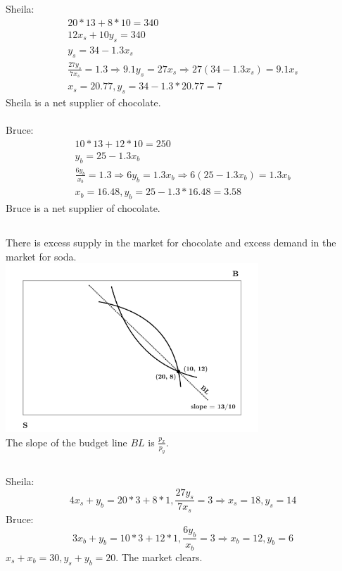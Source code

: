 \documentclass{article}
\begin{document}
	\subsection[d]{}
		Sheila:
		\setcounter{equation}{0}
		\begin{align}
			20*13+8*10 = 340\\
			12x_s+10y_s = 340\\
			y_s = 34-1.3x_s\\
			\frac{27y_s}{7x_s} = 1.3 \Rightarrow 9.1y_s = 27x_s \Rightarrow 27(34-1.3x_s) = 9.1x_s\\
			x_s = 20.77, y_s=34-1.3*20.77 = 7
		\end{align}
		Sheila is a net supplier of chocolate. 
		\\\\
		Bruce: 	
		\setcounter{equation}{0}
		\begin{align}
			10*13+12*10 = 250\\
			y_b = 25-1.3x_b\\
			\frac{6y_b}{x_b} = 1.3 \Rightarrow 6y_b = 1.3x_b \Rightarrow 6(25-1.3x_b)=1.3x_b\\
			x_b = 16.48, y_b=25-1.3*16.48 = 3.58
		\end{align}
		Bruce is a net supplier of chocolate.
	\subsection[e]{}
		There is excess supply in the market for chocolate and excess demand in the market for soda. \\
		\includegraphics[height=2.5in]{Charts/5e}\\
		The slope of the budget line $BL$ is $\frac{p_x}{p_y}$. 
	\subsection[f]{}
		Sheila: 
		$$4x_s+y_b = 20*3+8*1, \frac{27y_s}{7x_s}=3 \Rightarrow x_s = 18, y_s = 14$$
		Bruce:
		$$3x_b+y_b=10*3+12*1, \frac{6y_b}{x_b} = 3 \Rightarrow x_b = 12, y_b = 6$$
		$x_s+x_b = 30, y_s+y_b  = 20.$ The market clears. 
\end{document}
